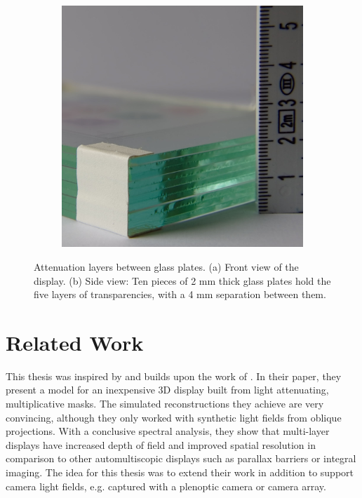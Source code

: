 \begin{figure}
\begin{subfigure}[t]{.49\textwidth}
		\includegraphics[width = \textwidth]{../Figures/hand_craft/glass_plates_side_view_cropped}
		\caption{}
		\label{fig:close_up_of_layers_between_glasses}
	\end{subfigure}
	\caption[Attenuation layers between glass plates]
			{Attenuation layers between glass plates.
			 (a) Front view of the display.
			 (b) Side view: Ten pieces of 2 mm thick glass plates hold the five layers of transparencies, with a 4 mm separation between them.}
\end{figure}

\section{Related Work}

This thesis was inspired by and builds upon the work of \cite{WetzsteinTomo}.
In their paper, they present a model for an inexpensive 3D display built from light attenuating, multiplicative masks.
The simulated reconstructions they achieve are very convincing, although they only worked with synthetic light fields from oblique projections.
With a conclusive spectral analysis, they show that multi-layer displays have increased depth of field and improved spatial resolution in comparison to other automultiscopic displays such as parallax barriers or integral imaging.
The idea for this thesis was to extend their work in addition to support camera light fields, e.g. captured with a plenoptic camera or camera array.

